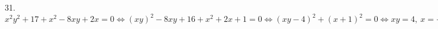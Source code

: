 31. $x^2y^2+17+x^2-8xy+2x=0\Leftrightarrow (xy)^2-8xy+16+x^2+2x+1=0\Leftrightarrow
(xy-4)^2+(x+1)^2=0\Leftrightarrow xy=4,\ x=-1\Leftrightarrow x=-1,\ y=-4.$\\

